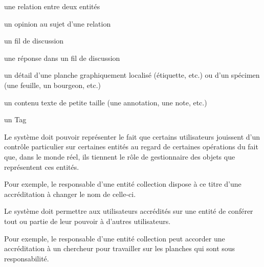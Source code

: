 \startsubsection[title={Entités contributives}]

\startitemize
	\item une relation entre deux entités
	\item un opinion au sujet d'une relation
	\item un fil de discussion
	\item une réponse dans un fil de discussion
	\item un détail d'une planche graphiquement localisé (étiquette, etc.) ou d'un spécimen (une feuille, un bourgeon, etc.)
	\item un contenu texte de petite taille (une annotation, une note, etc.)
	\item un Tag
\stopitemize

\startsection[title={Propriétés générales des entités}]

\startsubsection[title={Notion d'accréditation}]

\exig{}
Le système doit pouvoir représenter le fait que certains utilisateurs jouissent d'un contrôle particulier sur certaines entités au regard de certaines opérations du fait que, dans le monde réel, ils tiennent le rôle de gestionnaire des objets que représentent ces entités.

Pour exemple, le responsable d'une entité collection dispose à ce titre d'une accréditation à changer le nom de celle-ci.

\exig{}
Le système doit permettre aux utilisateurs accrédités sur une entité de conférer tout ou partie de leur pouvoir à d'autres utilisateurs.

Pour exemple, le responsable d'une entité collection peut accorder une accréditation à un chercheur pour travailler sur les planches qui sont sous responsabilité.

